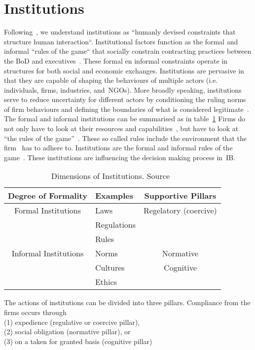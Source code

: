 \section{Institutions}\label{sec:InTh}


Following~\cite{North:1990}, we understand institutions as ``humanly devised constraints that structure human interaction``. 
Institutional factors function as the formal and informal ``rules of the game`` that socially constrain contracting practices between the \gls{BoD} and executives~\cite{North:1990}.
These formal en informal constraints operate in structures for both social and economic exchanges. 
Institutions are pervasive in that they are capable of shaping the behaviours of multiple actors (i.e. 
individuals, firms, industries, and~\glspl{NGO}). 
More broadly speaking, institutions serve to reduce uncertainty for different actors by conditioning the ruling norms of firm behaviours and defining the boundaries of what is considered legitimate~\cite{Peng:2008}.\\
The formal and informal institutions can be summarised as in table~\ref{tab:peng2008}
Firms do not only have to look at their resources and capabilities~\cite{Barney:1991}, but have to look at ``the rules of the game''~\cite{Scott:1995}. 
These so called rules include the environment that the firm \mne~has to adhere to.
Institutions are the formal and informal rules of the game~\cite{North:1990}. These institutions are influencing the decision making process in~\gls{IB}.

\begin{table}[htb]
  \centering
  \caption{Dimensions of Institutions. Source~\cite{Peng:2008b}} \label{tab:peng2008}
\begin{tabular}{c|l|c} 
  Degree of Formality & Examples & Supportive Pillars\\ 
  \midrule 
  \midrule
  Formal Institutions& Laws&  Regelatory (coercive)\\
  &Regulations&\\
  &Rules&\\
  Informal Institutions&Norms &Normative \\
  & Cultures&Cognitive\\
  &Ethics&\\ 
  \bottomrule
\end{tabular}
\end{table}

\noindent
The actions of institutions can be divided into three pillars. 
Compliance from the firms occurs through \\
(1) expedience (regulative or coercive pillar),\\
(2) social obligation (normative pillar), or \\
(3) on a taken for granted basis (cognitive pillar) \\
 
